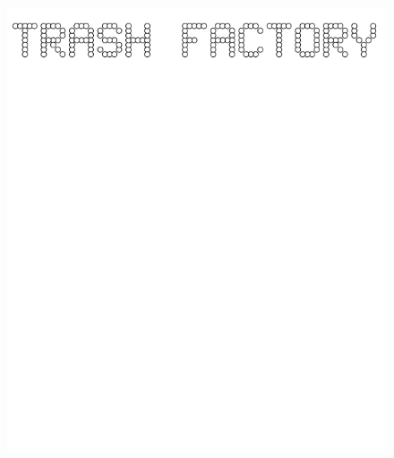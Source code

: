 \documentclass[17pt]{extreport}
\begin{document}
	\begin{figure}
		\centering
		\includegraphics[width=6.25in]{imageserver/uploadimages/trashfactory.png}
	\end{figure}
	
\end{document}

